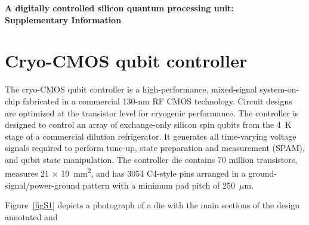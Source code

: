 \documentclass[aps,prl,twocolumn,superscriptaddress,nobibnotes,10pt,floatfix]{revtex4-2}
\newenvironment{widetext}{\vspace{2ex}}{\vspace{2ex}}
\begin{document}
\clearpage


\renewcommand{\thesection}{S\arabic{section}}
\renewcommand{\figurename}{Supplementary Fig.}
\renewcommand{\thefigure}{S\arabic{figure}}
\renewcommand{\theHfigure}{S\arabic{figure}}
\renewcommand{\theequation}{S\arabic{equation}}
\renewcommand{\thetable}{S\arabic{table}}
\renewcommand{\thepage}{S\arabic{page}}

\begin{widetext}






\setcounter{section}{0}
\setcounter{figure}{0}
\setcounter{equation}{0}
\setcounter{table}{0}
\setcounter{page}{1}


\makeatletter
\def\@seccntformat#1{\csname the#1\endcsname.\quad}
\setcounter{secnumdepth}{2}
\setcounter{enumiv}{0}
\makeatother


\begin{center}
	{\large \bfseries A digitally controlled silicon quantum processing unit: \\ Supplementary Information}





\end{center}

\end{widetext}
\tableofcontents
\clearpage

\section{Cryo-CMOS qubit controller}\label{cryo-cmos-qubit-controller}

The cryo-CMOS qubit controller is a high-performance, mixed-signal system-on-chip fabricated in a commercial 130-nm RF CMOS technology.
Circuit designs are optimized at the transistor level for cryogenic performance.
The controller is designed to control an array of exchange-only silicon spin qubits from the 4~K stage of a commercial dilution refrigerator.
It generates all time-varying voltage signals required to perform tune-up, state preparation and measurement (SPAM), and qubit state manipulation.
The controller die contains 70 million transistors, measures 21 $\times$ 19~mm\textsuperscript{2}, and has 3054 C4-style pins arranged in a ground-signal/power-ground pattern with a minimum pad pitch of 250~$\mu$m.

Figure~\ref{figS1}
depicts a photograph of a die with the main sections of the design annotated and
\end{document}
